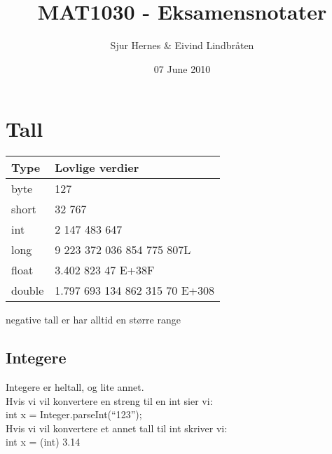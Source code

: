 \documentclass[11pt]{article}
\title{MAT1030 - Eksamensnotater}
\author{Sjur Hernes \& Eivind Lindbråten}
\date{07 June 2010}
\begin{document}
\maketitle

\setcounter{tocdepth}{3}
\tableofcontents
\vspace*{1cm}
\section{Tall}
\label{sec-1}



\begin{center}
\begin{tabular}{ll}
\hline
 \textbf{Type}  &  \textbf{Lovlige verdier}                 \\
\hline
 byte           &  \textpm{}127                             \\
\hline
 short          &  \textpm{}32 767                          \\
\hline
 int            &  \textpm{}2 147 483 647                   \\
\hline
 long           &  \textpm{}9 223 372 036 854 775 807L      \\
\hline
 float          &  \textpm{}3.402 823 47 E+38F              \\
\hline
 double         &  \textpm{}1.797 693 134 862 315 70 E+308  \\
\hline
\end{tabular}
\end{center}



  negative tall er har alltid en større range 
\subsection{Integere}
\label{sec-1_1}


   Integere er heltall, og lite annet.\\
   \newline
   Hvis vi vil konvertere en streng til en int sier vi:\\
   int x = Integer.parseInt(``123'');\\
   \newline
   Hvis vi vil konvertere et annet tall til int skriver vi:\\
   int x = (int) 3.14\\
   \newline 
\end{document}
